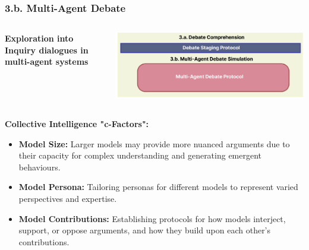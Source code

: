 \documentclass{beamer}
\begin{document}
\begin{frame}
\frametitle{3.b. Multi-Agent Debate}

\begin{columns}[T] %

    \begin{column}{.48\textwidth}
        \textbf{Exploration into Inquiry dialogues in multi-agent systems}
    \end{column}

    \begin{column}{.48\textwidth}
        \includegraphics[width=\textwidth]{MAD-stage-3.png}
    \end{column}
\end{columns}

\vspace{0.5cm} %
    \textbf{Collective Intelligence "c-Factors":} 
        \begin{itemize}
        \item \textbf{Model Size:} Larger models may provide more nuanced arguments due to their capacity for complex understanding and generating emergent behaviours.
        \item \textbf{Model Persona:} Tailoring personas for different models to represent varied perspectives and expertise.
        \item \textbf{Model Contributions:} Establishing protocols for how models interject, support, or oppose arguments, and how they build upon each other's contributions.
    \end{itemize}

\end{frame}
\end{document}
